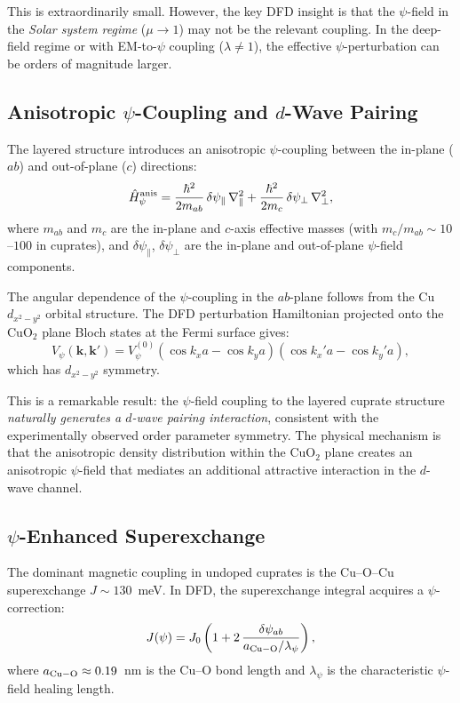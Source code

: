 \documentclass[aps,prb,twocolumn,superscriptaddress,floatfix,nofootinbib,longbibliography]{revtex4-2}
\begin{document}
This is extraordinarily small.  However, the key DFD insight is that the
$\psi$-field in the \emph{Solar system regime} ($\mu \to 1$) may not be
the relevant coupling.  In the deep-field regime or with EM-to-$\psi$
coupling ($\lambda \neq 1$), the effective $\psi$-perturbation can be
orders of magnitude larger.

\subsection{Anisotropic $\psi$-Coupling and $d$-Wave Pairing}

The layered structure introduces an anisotropic $\psi$-coupling between
the in-plane ($ab$) and out-of-plane ($c$) directions:
\begin{equation}
\hat{H}_\psi^{\rm anis} = \frac{\hbar^2}{2m_{ab}}\,\delta\psi_\parallel\,
\nabla_\parallel^2
+ \frac{\hbar^2}{2m_c}\,\delta\psi_\perp\,\nabla_\perp^2,
\label{eq:anis-coupling}
\end{equation}
where $m_{ab}$ and $m_c$ are the in-plane and $c$-axis effective masses
(with $m_c/m_{ab} \sim 10$--$100$ in cuprates), and
$\delta\psi_\parallel$, $\delta\psi_\perp$ are the in-plane and
out-of-plane $\psi$-field components.

The angular dependence of the $\psi$-coupling in the $ab$-plane follows
from the Cu $d_{x^2-y^2}$ orbital structure.  The DFD perturbation
Hamiltonian projected onto the CuO$_2$ plane Bloch states at the Fermi
surface gives:
\begin{equation}
V_\psi(\mathbf{k}, \mathbf{k}') = V_\psi^{(0)}\left(\cos k_x a - \cos k_y a\right)
\left(\cos k_x' a - \cos k_y' a\right),
\label{eq:V-psi-d}
\end{equation}
which has $d_{x^2-y^2}$ symmetry.

This is a remarkable result: the $\psi$-field coupling to the layered
cuprate structure \emph{naturally generates a $d$-wave pairing
interaction}, consistent with the experimentally observed order parameter
symmetry.  The physical mechanism is that the anisotropic density
distribution within the CuO$_2$ plane creates an anisotropic $\psi$-field
that mediates an additional attractive interaction in the $d$-wave channel.

\subsection{$\psi$-Enhanced Superexchange}

The dominant magnetic coupling in undoped cuprates is the Cu--O--Cu
superexchange $J \sim 130$~meV.  In DFD, the superexchange integral
acquires a $\psi$-correction:
\begin{equation}
J(\psi) = J_0\left(1 + 2\,\frac{\delta\psi_{ab}}{a_{\rm Cu-O}/\lambda_\psi}\right),
\label{eq:superexchange}
\end{equation}
where $a_{\rm Cu-O} \approx 0.19$~nm is the Cu--O bond length and
$\lambda_\psi$ is the characteristic $\psi$-field healing length.
\end{document}

